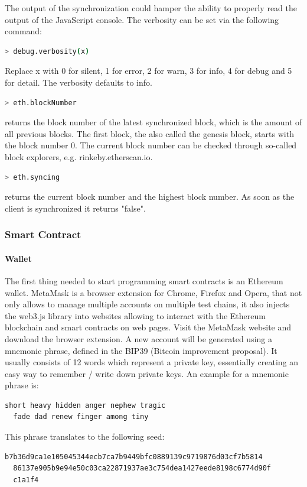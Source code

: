 The output of the synchronization could hamper the ability to properly read the output of the JavaScript console. The verbosity can be set via the following command:

\begin{lstlisting}[language=bash]
  > debug.verbosity(x)
\end{lstlisting}

Replace x with 0 for silent, 1 for error, 2 for warn, 3 for info, 4 for debug and 5 for detail. The verbosity defaults to info\cite{cli-options}.
\newpage

\begin{lstlisting}[language=bash]
  > eth.blockNumber
\end{lstlisting}

returns the block number of the latest synchronized block, which is the amount of all previous blocks. The first block, the also called the genesis block, starts with the block number 0. The current block number can be checked through so-called block explorers, e.g. {rinkeby.etherscan.io}.
\\
\begin{lstlisting}[language=bash]
  > eth.syncing
\end{lstlisting}
returns the current block number and the highest block number. As soon as the client is synchronized it returns "false"\cite{javascript-0.20}.
\\
\subsubsection{Smart Contract}
\paragraph{Wallet}
The first thing needed to start programming smart contracts is an Ethereum wallet. MetaMask is a browser extension for Chrome, Firefox and Opera, that not only allows to manage multiple accounts on multiple test chains, it also injects the web3.js library into websites allowing to interact with the Ethereum blockchain and smart contracts on web pages.
Visit the MetaMask\cite{metamask} website and download the browser extension. A new account will be generated using a mnemonic phrase, defined in the BIP39 (Bitcoin improvement proposal)\cite{bip39}. It usually consists of 12 words which represent a private key, essentially creating an easy way to remember / write down private keys. An example for a mnemonic phrase is:
\begin{lstlisting}[language=bash]
  short heavy hidden anger nephew tragic
  fade dad renew finger among tiny
\end{lstlisting}
This phrase translates to the following seed:
\begin{lstlisting}[language=bash]
  b7b36d9ca1e105045344ecb7ca7b9449bfc0889139c9719876d03cf7b5814
  86137e905b9e94e50c03ca22871937ae3c754dea1427eede8198c6774d90f
  c1a1f4
\end{lstlisting}

